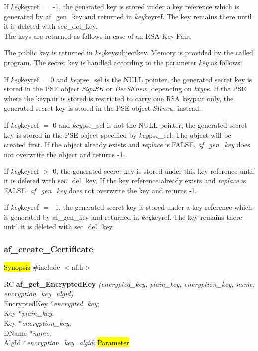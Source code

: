 If {\em key}\pf keyref $=$ -1, the generated key is stored under a key reference which is generated 
by af\_gen\_key and returned in {\em key}\pf keyref. The key remains there until it is deleted
with sec\_del\_key. \\ [0.5cm]
The keys are returned as follows in case of an RSA Key Pair:

The public key is returned in {\em key}\pf key\pf subjectkey. Memory is provided by the called program.
The secret key is handled according to the parameter {\em key} as follows: 

If {\em key}\pf keyref $= 0$ and {\em key}\pf pse\_sel is the NULL pointer, the
generated secret key is stored in the PSE object {\em SignSK} or
{\em DecSKnew}, depending on {\em ktype}. 
If the PSE where the keypair is stored is restricted to carry one RSA keypair only, 
the generated secret key is stored in the PSE object {\em SKnew}, instead.

If {\em key}\pf keyref $=$ 0 and {\em key}\pf pse\_sel is not the NULL pointer, the generated secret key
is stored in the PSE object specified by {\em key}\pf pse\_sel. The object will be
created first. 
If the object already exists and {\em replace} is FALSE, {\em af\_gen\_key}
does not overwrite the object and returns -1.
 
If {\em key}\pf keyref $>$ 0, the generated secret key is stored under this key reference until it is
deleted with sec\_del\_key. 
If the key reference already exists and {\em replace} is FALSE, {\em af\_gen\_key}
does not overwrite the key and returns -1.
 
If {\em key}\pf keyref $=$ -1, the generated secret key is stored under a key reference which is generated 
by af\_gen\_key and returned in {\em key}\pf keyref. The key remains there until it is deleted
with sec\_del\_key.

\subsubsection{af\_create\_Certificate}
\label{af_get_EncryptedKey}
\hl{Synopsis}
\#include $<$af.h$>$

RC {\bf af\_get\_EncryptedKey} {\em (encrypted\_key, plain\_key, encryption\_key, name, encryption\_key\_algid)} \\
EncryptedKey *{\em encrypted\_key}; \\
Key *{\em plain\_key}; \\
Key *{\em encryption\_key}; \\
DName *{\em name}; \\
AlgId *{\em encryption\_key\_algid};
\hl{Parameter}

